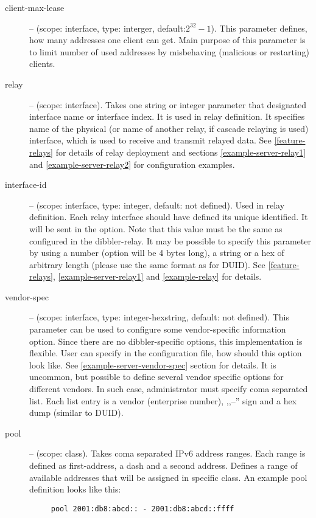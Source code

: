 \begin{description}
\item[client-max-lease] -- (scope: interface, type: interger,
            default:$2^{32}-1$). This parameter defines, how many
            addresses one client can get. Main purpose of this
            parameter is to limit number of used addresses by
            misbehaving (malicious or restarting) clients.

\item[relay] -- (scope: interface). Takes one string or integer
  parameter that designated interface name or interface index. It is
  used in relay definition.  It specifies name of the physical (or
  name of another relay, if cascade relaying is used) interface, which
  is used to receive and transmit relayed data. See
  \ref{feature-relays} for details of relay deployment and sections
  \ref{example-server-relay1} and \ref{example-server-relay2} for
  configuration examples.

\item[interface-id] -- (scope: interface, type: integer, default: not
  defined). Used in relay definition. Each relay interface should have
  defined its unique identified. It will be sent in the
   option. Note that this value must be the same as
  configured in the dibbler-relay. It may be possible to specify this
  parameter by using a number (option will be 4 bytes long), a string
  or a hex of arbitrary length (please use the same format as for
  DUID). See \ref{feature-relays}, \ref{example-server-relay1} and
  \ref{example-relay} for details.

 \item[vendor-spec] -- (scope: interface, type: integer-hexstring,
   default: not defined). This parameter can be used to configure some
   vendor-specific information option. Since there are no
   dibbler-specific options, this implementation is flexible. User can
   specify in the configuration file, how should this option look
   like. See \ref{example-server-vendor-spec} section for details. It
   is uncommon, but possible to define several vendor specific options
   for different vendors. In such case, administrator must specify
   coma separated list. Each list entry is a vendor (enterprise
   number), ,,--'' sign and a hex dump (similar to DUID).

 \item[pool] -- (scope: class). Takes coma separated IPv6 address
   ranges. Each range is defined as first-address, a dash and a second
   address. Defines a range of available addresses that will be
   assigned in specific class. An example pool definition looks like
   this:
   \begin{lstlisting}
     pool 2001:db8:abcd:: - 2001:db8:abcd::ffff
   \end{lstlisting}


\end{description}
